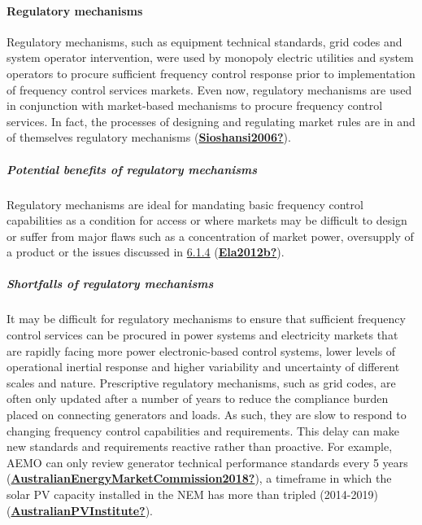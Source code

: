 \documentclass[12pt,a4paper,]{report}
\begin{document}
\hypertarget{sec:regulatory_mech}{%
\paragraph{Regulatory mechanisms}\label{sec:regulatory_mech}}

Regulatory mechanisms, such as equipment technical standards, grid codes
and system operator intervention, were used by monopoly electric
utilities and system operators to procure sufficient frequency control
response prior to implementation of frequency control services markets.
Even now, regulatory mechanisms are used in conjunction with
market-based mechanisms to procure frequency control services. In fact,
the processes of designing and regulating market rules are in and of
themselves regulatory mechanisms
(\protect\hyperlink{ref-Sioshansi2006}{\textbf{Sioshansi2006?}}).

\hypertarget{potential-benefits-of-regulatory-mechanisms}{%
\subparagraph{Potential benefits of regulatory
mechanisms}\label{potential-benefits-of-regulatory-mechanisms}}

Regulatory mechanisms are ideal for mandating basic frequency control
capabilities as a condition for access or where markets may be difficult
to design or suffer from major flaws such as a concentration of market
power, oversupply of a product or the issues discussed in
\protect\hyperlink{sec:challgnes_fcas_markets}{6.1.4}
(\protect\hyperlink{ref-Ela2012b}{\textbf{Ela2012b?}}).

\hypertarget{shortfalls-of-regulatory-mechanisms}{%
\subparagraph{Shortfalls of regulatory
mechanisms}\label{shortfalls-of-regulatory-mechanisms}}

It may be difficult for regulatory mechanisms to ensure that sufficient
frequency control services can be procured in power systems and
electricity markets that are rapidly facing more power electronic-based
control systems, lower levels of operational inertial response and
higher variability and uncertainty of different scales and nature.
Prescriptive regulatory mechanisms, such as grid codes, are often only
updated after a number of years to reduce the compliance burden placed
on connecting generators and loads. As such, they are slow to respond to
changing frequency control capabilities and requirements. This delay can
make new standards and requirements reactive rather than proactive. For
example, AEMO can only review generator technical performance standards
every 5 years
(\protect\hyperlink{ref-AustralianEnergyMarketCommission2018}{\textbf{AustralianEnergyMarketCommission2018?}}),
a timeframe in which the solar PV capacity installed in the NEM has more
than tripled (2014-2019)
(\protect\hyperlink{ref-AustralianPVInstitute}{\textbf{AustralianPVInstitute?}}).
\end{document}
